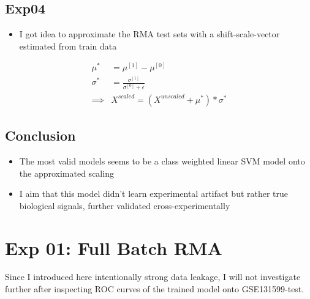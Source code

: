 \documentclass{article}
\begin{document}
		\subsection*{Exp04}
			\begin{itemize}
				\item I got idea to approximate the RMA test sets with a shift-scale-vector estimated from train data
			\end{itemize}
			\begin{align*}
				\mu^{*} &= \mu^{[1]} - \mu^{[0]} \\
				\sigma^{*} &= \frac{\sigma^{[1]}}{\sigma^{[0]} + \epsilon} \\
				\implies& X^{scaled} = (X^{unscaled} + \mu^{*}) * \sigma^{*} \tag*{Approximation}
			\end{align*}
	
		\subsection{Conclusion}
			
			\begin{itemize}
				\item The most valid models seems to be a class weighted linear SVM model onto the approximated scaling
				\item I aim that this model didn't learn experimental artifact but rather true biological signals, further validated cross-experimentally
			\end{itemize}

			
	
	
	
	
	\newpage
	
	\section{Exp 01: Full Batch RMA}
	
		Since I introduced here intentionally strong data leakage, I will not investigate further after inspecting ROC curves of the trained model onto GSE131599-test.  \\
	
\end{document}

